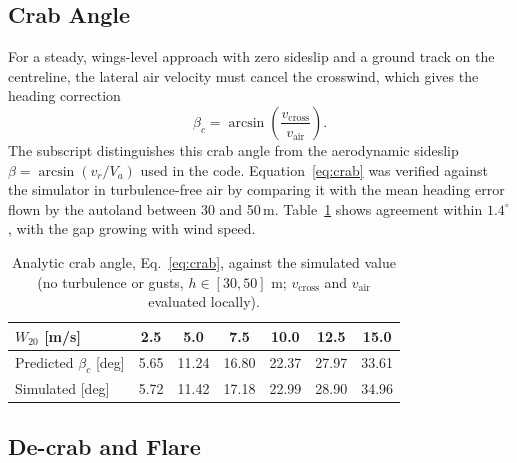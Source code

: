 \documentclass[10pt,a4paper]{article}
\begin{document}
\subsection{Crab Angle}

For a steady, wings-level approach with zero sideslip and a ground track on the
centreline, the lateral air velocity must cancel the crosswind, which gives the
heading correction
\begin{equation}
\beta_{c}=\arcsin\left(\frac{v_{\mathrm{cross}}}{v_{\mathrm{air}}}\right).
\label{eq:crab}
\end{equation}
The subscript distinguishes this crab angle from the aerodynamic sideslip
\(\beta=\arcsin(v_r/V_a)\) used in the code. Equation~\eqref{eq:crab} was verified
against the simulator in turbulence-free air by comparing it with the mean heading
error flown by the autoland between 30 and 50\,m. Table~\ref{tab:crab} shows
agreement within \(1.4^\circ\), with the gap growing with wind speed.

\begin{table}[H]
\centering
\caption{Analytic crab angle, Eq.~\eqref{eq:crab}, against the simulated value (no turbulence or gusts, \(h\in[30,50]\) m; \(v_{\mathrm{cross}}\) and \(v_{\mathrm{air}}\) evaluated locally).}
\label{tab:crab}
\small
\begin{tabular}{@{}lcccccc@{}}
\toprule
\(W_{20}\) [m/s] & 2.5 & 5.0 & 7.5 & 10.0 & 12.5 & 15.0\\
\midrule
Predicted \(\beta_c\) [deg] & 5.65 & 11.24 & 16.80 & 22.37 & 27.97 & 33.61\\
Simulated [deg] & 5.72 & 11.42 & 17.18 & 22.99 & 28.90 & 34.96\\
\bottomrule
\end{tabular}
\end{table}

\subsection{De-crab and Flare}
\end{document}
